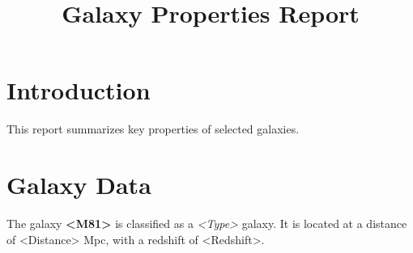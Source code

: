 \documentclass{article}
\title{Galaxy Properties Report}
\author{}
\date{}
\begin{document}
\maketitle

\section{Introduction}
This report summarizes key properties of selected galaxies.

\section{Galaxy Data}
The galaxy \textbf{<M81>} is classified as a \textit{<Type>} galaxy. 
It is located at a distance of <Distance> Mpc, with a redshift of <Redshift>.
\end{document}
